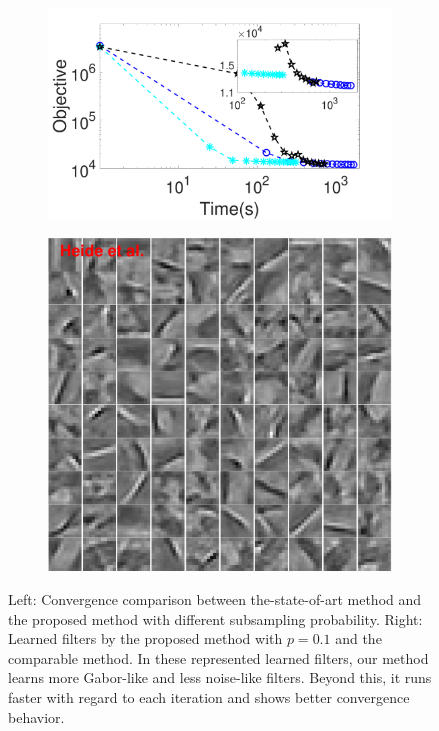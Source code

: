 \begin{figure}[h]
\begin{subfigure}{0.6\textwidth}
  \includegraphics[width=1\linewidth]{figure/timeVSobj.pdf}
\end{subfigure}
\begin{subfigure}{0.3\textwidth}
  \includegraphics[width=1\linewidth]{figure/heideFruit100.pdf}
\end{subfigure}

\caption{Left: Convergence comparison between the-state-of-art method\cite{heide2015fast} and the proposed method with different subsampling probability. Right: Learned filters by the proposed method with $p=0.1$ and the comparable method. In these represented learned filters, our method learns more Gabor-like and less noise-like filters. Beyond this, it runs faster with regard to each iteration and shows better convergence behavior.}
\label{fig:subsampleResult}
\end{figure}

